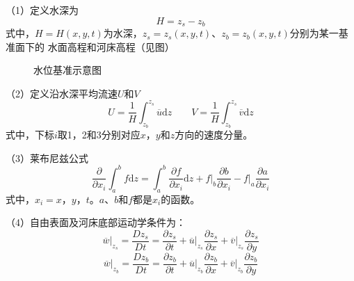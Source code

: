 （1）定义水深为
\begin{equation}
  H =  z_{s} - z_{b}
\end{equation}
式中，$H=H(x,y,t)$为水深，$ z_{s}= z_{s}(x,y,t)$、$z_{b}=z_{b}(x,y,t)$分别为某一基准面下的
水面高程和河床高程（见图）

\begin{figure}
  \begin{tikzpicture}
  \end{tikzpicture}
  \caption{水位基准示意图}
\end{figure}

（2）定义沿水深平均流速$U$和$V$
\begin{equation}
  U
  =
  \frac{1}{H}
\int_{z_{b}}^{ z_{s}}\!\overline{u}\mathrm{d}z
\quad
\quad
  V
  =
  \frac{1}{H}
\int_{z_{b}}^{ z_{s}}\!\overline{v}\mathrm{d}z
\end{equation}
式中，下标$i$取1，2和3分别对应$x$，$y$和$z$方向的速度分量。

（3）莱布尼兹公式
\begin{equation}
  \frac{\partial}{\partial x_{i}}
  \int_{a}^{b}\!f\mathrm{d}z
  =
  \int_{a}^{b}\!
  \frac{\partial f}{\partial x_{i}}\mathrm{d}z
  +
  \left.f\right|_{b}\frac{\partial b}{\partial x_{i}}
  -
  \left.f\right|_{a}\frac{\partial a}{\partial x_{i}}
    \label{EqCGeLeibnizLaw}
\end{equation}
式中，$x_{i}=x$，$y$，$t$。$a$、$b$和$f$都是$x_{i}$的函数。

（4）自由表面及河床底部运动学条件为：
\begin{equation}
  \left.\overline{w}\right|_{z_{s}}
    =
    \frac{D z_{s}}{Dt}
    =
    \frac{\partial z_{s}}{\partial t}
    +
    \left.\overline{u}\right|_{z_{s}}\frac{\partial z_{s}}{\partial x}
      +
    \left.\overline{v}\right|_{z_{s}}\frac{\partial z_{s}}{\partial y}
    \label{EqCGeSMC}
\end{equation}
\begin{equation}
  \left.\overline{w}\right|_{z_{b}}
    =
    \frac{Dz_{b}}{Dt}
    =
    \frac{\partial z_{b}}{\partial t}
    +
    \left.\overline{u}\right|_{z_{b}}\frac{\partial z_{b}}{\partial x}
      +
    \left.\overline{v}\right|_{z_{b}}\frac{\partial z_{b}}{\partial y}
    \label{EqCGeBMC}
\end{equation}

